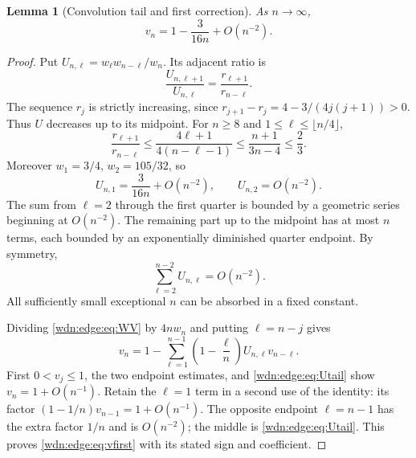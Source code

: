 \documentclass[11pt,letterpaper]{article}
\newtheorem{lemma}[theorem]{Lemma}
\theoremstyle{remark}\newtheorem{remark}[theorem]{Remark}
\begin{document}
\begin{lemma}[Convolution tail and first correction]\label{wdn:edge:lem:tail}
As $n\to\infty$,
\begin{equation}\label{wdn:edge:eq:vfirst}
 v_n=1-\frac3{16n}+O(n^{-2}).
\end{equation}
\end{lemma}
\begin{proof}
Put $U_{n,\ell}=w_\ell w_{n-\ell}/w_n$. Its adjacent ratio is
\[
 \frac{U_{n,\ell+1}}{U_{n,\ell}}
 =\frac{r_{\ell+1}}{r_{n-\ell}}.
\]
The sequence $r_j$ is strictly increasing, since
$r_{j+1}-r_j=4-3/(4j(j+1))>0$. Thus $U$ decreases up to its midpoint.
For $n\ge8$ and $1\le\ell\le\lfloor n/4\rfloor$,
\[
 \frac{r_{\ell+1}}{r_{n-\ell}}
 \le\frac{4\ell+1}{4(n-\ell-1)}
 \le\frac{n+1}{3n-4}\le\frac23.
\]
Moreover $w_1=3/4$, $w_2=105/32$, so
\[
 U_{n,1}=\frac3{16n}+O(n^{-2}),\qquad U_{n,2}=O(n^{-2}).
\]
The sum from $\ell=2$ through the first quarter is bounded by a geometric
series beginning at $O(n^{-2})$. The remaining part up to the midpoint
has at most $n$ terms, each bounded by an exponentially diminished
quarter endpoint. By symmetry,
\begin{equation}\label{wdn:edge:eq:Utail}
 \sum_{\ell=2}^{n-2}U_{n,\ell}=O(n^{-2}).
\end{equation}
All sufficiently small exceptional $n$ can be absorbed in a fixed constant.

Dividing \eqref{wdn:edge:eq:WV} by $4nw_n$ and putting $\ell=n-j$ gives
\begin{equation}\label{wdn:edge:eq:vrec}
 v_n=1-\sum_{\ell=1}^{n-1}
 \left(1-\frac\ell n\right)U_{n,\ell}v_{n-\ell}.
\end{equation}
First $0<v_j\le1$, the two endpoint estimates, and \eqref{wdn:edge:eq:Utail}
show $v_n=1+O(n^{-1})$. Retain the $\ell=1$ term in a second use of the
identity: its factor $(1-1/n)v_{n-1}=1+O(n^{-1})$.
The opposite endpoint $\ell=n-1$ has the extra factor $1/n$ and is
$O(n^{-2})$; the middle is \eqref{wdn:edge:eq:Utail}. This proves
\eqref{wdn:edge:eq:vfirst} with its stated sign and coefficient.
\end{proof}
\end{document}
